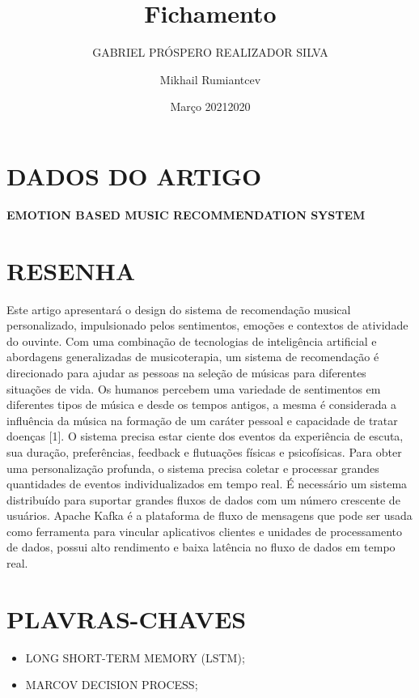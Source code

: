 \documentclass{article}
\title{Fichamento}
\author{GABRIEL PRÓSPERO REALIZADOR  SILVA}
\date{Março 2021}
\begin{document}
\maketitle

\section{DADOS DO ARTIGO}
\textbf{EMOTION BASED MUSIC RECOMMENDATION SYSTEM \\}
\author{Mikhail Rumiantcev \\}
\date{2020}

\section{RESENHA}
Este artigo apresentará o design do sistema de recomendação musical personalizado, impulsionado pelos sentimentos, emoções e contextos de atividade do ouvinte. 
Com uma combinação de tecnologias de inteligência artificial e abordagens generalizadas de musicoterapia, um sistema de recomendação é direcionado para ajudar as pessoas na seleção de músicas para diferentes situações de vida. 
Os humanos percebem uma variedade de sentimentos em diferentes tipos de música e desde os tempos antigos, a mesma é considerada a influência da música na formação de um caráter pessoal e capacidade de tratar doenças [1]. 
O sistema precisa estar ciente dos eventos da experiência de escuta, sua duração, preferências, feedback e flutuações físicas e psicofísicas. 
Para obter uma personalização profunda, o sistema precisa coletar e processar grandes quantidades de eventos individualizados em tempo real. 
É necessário um sistema distribuído para suportar grandes fluxos de dados com um número crescente de usuários. 
Apache Kafka é a plataforma de fluxo de mensagens que pode ser usada como ferramenta para vincular aplicativos clientes e unidades de processamento de dados, possui alto rendimento e baixa latência no fluxo de dados em tempo real. 

\section{PLAVRAS-CHAVES}
\begin{itemize}
    \item LONG SHORT-TERM MEMORY (LSTM); 
    \item MARCOV DECISION PROCESS;
\end{itemize}
\end{document}

